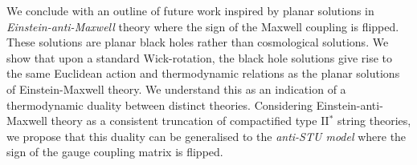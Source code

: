 We conclude with an outline of future work inspired by planar solutions in \emph{Einstein-anti-Maxwell} theory where the sign of the Maxwell coupling is flipped. These solutions are planar black holes rather than cosmological solutions. We show that upon a standard Wick-rotation, the black hole solutions give rise to the same Euclidean action and thermodynamic relations as the planar solutions of Einstein-Maxwell theory. We understand this as an indication of a thermodynamic duality between distinct theories. Considering  Einstein-anti-Maxwell theory as a consistent truncation of compactified type II$^*$ string theories, we propose that this duality can be generalised to the \emph{anti-STU model} where the sign of the gauge coupling matrix is flipped.		

\vfill
